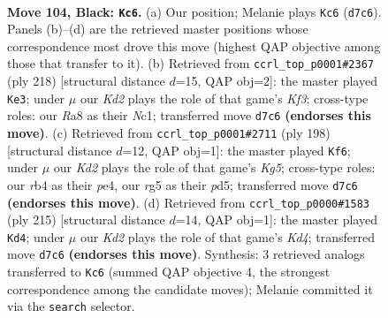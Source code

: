 \documentclass[11pt]{article}
\begin{document}
\clearpage

\begin{figure}[p]\centering
\begin{subfigure}{0.46\textwidth}\centering
\resizebox{\linewidth}{!}{%
\newchessgame
\chessboard[
  setfen={r7/3k4/4p3/6R1/1R2PP2/8/8/5K2 b - - 0 104},
  showmover=false,
  pgfstyle=straightmove, color=movearrow, markmove={d7-c6}
]}
\caption{}
\end{subfigure}\hfill
\begin{subfigure}{0.46\textwidth}\centering
\resizebox{\linewidth}{!}{%
\newchessgame
\chessboard[
  setfen={8/4r3/8/2k1p3/4P3/5K2/8/2N5 w - - 74 110},
  showmover=false,
  pgfstyle=straightmove, color=movearrow, markmove={f3-e3}
]}
\caption{}
\end{subfigure}
\\[4pt]
\begin{subfigure}{0.46\textwidth}\centering
\resizebox{\linewidth}{!}{%
\newchessgame
\chessboard[
  setfen={8/3k4/1R6/3p1PK1/3Pp3/r7/8/8 w - - 1 100},
  showmover=false,
  pgfstyle=straightmove, color=movearrow, markmove={g5-f6}
]}
\caption{}
\end{subfigure}\hfill
\begin{subfigure}{0.46\textwidth}\centering
\resizebox{\linewidth}{!}{%
\newchessgame
\chessboard[
  setfen={4R3/8/8/3k4/r5p1/6P1/3K1P2/8 b - - 18 108},
  showmover=false,
  pgfstyle=straightmove, color=movearrow, markmove={d5-d4}
]}
\caption{}
\end{subfigure}
\caption{\textbf{Move 104, Black: \texttt{Kc6}.} (a) Our position; Melanie plays \texttt{Kc6} (\texttt{d7c6}). Panels (b)--(d) are the retrieved master positions whose correspondence most drove this move (highest QAP objective among those that transfer to it). (b) Retrieved from \texttt{ccrl\_top\_p0001\#2367} (ply 218) [structural distance $d$=15, QAP obj=2]: the master played \texttt{Ke3}; under $\mu$ our \emph{Kd2} plays the role of that game's \emph{Kf3}; cross-type roles: our \emph{R}a8 as their \emph{N}c1; transferred move \texttt{d7c6} \textbf{(endorses this move)}. (c) Retrieved from \texttt{ccrl\_top\_p0001\#2711} (ply 198) [structural distance $d$=12, QAP obj=1]: the master played \texttt{Kf6}; under $\mu$ our \emph{Kd2} plays the role of that game's \emph{Kg5}; cross-type roles: our \emph{r}b4 as their \emph{p}e4, our \emph{r}g5 as their \emph{p}d5; transferred move \texttt{d7c6} \textbf{(endorses this move)}. (d) Retrieved from \texttt{ccrl\_top\_p0000\#1583} (ply 215) [structural distance $d$=14, QAP obj=1]: the master played \texttt{Kd4}; under $\mu$ our \emph{Kd2} plays the role of that game's \emph{Kd4}; transferred move \texttt{d7c6} \textbf{(endorses this move)}. Synthesis: 3 retrieved analogs transferred to \texttt{Kc6} (summed QAP objective 4, the strongest correspondence among the candidate moves); Melanie committed it via the \texttt{search} selector.}
\label{fig:thought-m207}
\end{figure}
\end{document}
